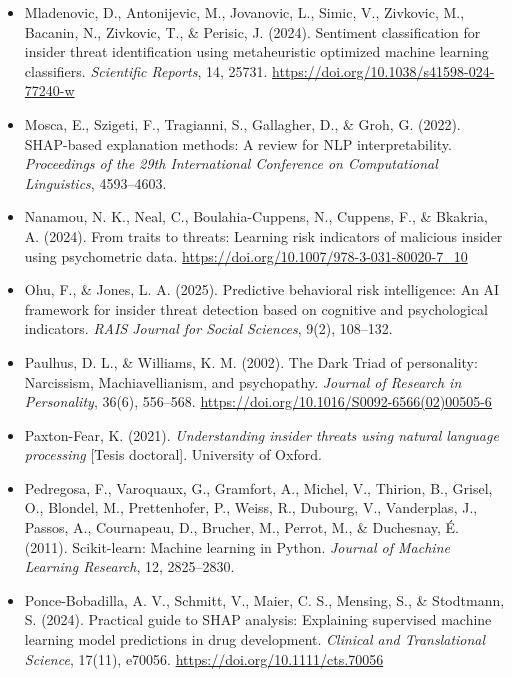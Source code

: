 \documentclass[IB]{TFUOC}%
\begin{document}
\begin{itemize}
    \item Mladenovic, D., Antonijevic, M., Jovanovic, L., Simic, V., Zivkovic, 
    M., Bacanin, N., Zivkovic, T., \& Perisic, J. (2024). Sentiment 
    classification for insider threat identification using metaheuristic 
    optimized machine learning classifiers. \textit{Scientific Reports}, 14, 
    25731. \url{https://doi.org/10.1038/s41598-024-77240-w}

    \item Mosca, E., Szigeti, F., Tragianni, S., Gallagher, D., \& Groh, G. 
    (2022). SHAP-based explanation methods: A review for NLP interpretability. 
    \textit{Proceedings of the 29th International Conference on Computational 
    Linguistics}, 4593--4603.

    \item Nanamou, N. K., Neal, C., Boulahia-Cuppens, N., Cuppens, F., \& 
    Bkakria, A. (2024). From traits to threats: Learning risk indicators of 
    malicious insider using psychometric data. 
    \url{https://doi.org/10.1007/978-3-031-80020-7_10}

    \item Ohu, F., \& Jones, L. A. (2025). Predictive behavioral risk 
    intelligence: An AI framework for insider threat detection based on 
    cognitive and psychological indicators. \textit{RAIS Journal for Social 
    Sciences}, 9(2), 108--132.

    \item Paulhus, D. L., \& Williams, K. M. (2002). The Dark Triad of personality: Narcissism, Machiavellianism, and psychopathy. \textit{Journal of Research in Personality}, 36(6), 556--568.
    \url{https://doi.org/10.1016/S0092-6566(02)00505-6}

    \item Paxton-Fear, K. (2021). \textit{Understanding insider threats using 
    natural language processing} [Tesis doctoral]. University of Oxford.

    \item Pedregosa, F., Varoquaux, G., Gramfort, A., Michel, V., Thirion, B., 
    Grisel, O., Blondel, M., Prettenhofer, P., Weiss, R., Dubourg, V., 
    Vanderplas, J., Passos, A., Cournapeau, D., Brucher, M., Perrot, M., \& 
    Duchesnay, É. (2011). Scikit-learn: Machine learning in Python. 
    \textit{Journal of Machine Learning Research}, 12, 2825--2830.

    \item Ponce-Bobadilla, A. V., Schmitt, V., Maier, C. S., Mensing, S., \& 
    Stodtmann, S. (2024). Practical guide to SHAP analysis: Explaining 
    supervised machine learning model predictions in drug development. 
    \textit{Clinical and Translational Science}, 17(11), e70056. 
    \url{https://doi.org/10.1111/cts.70056}


\end{itemize}
\end{document}
